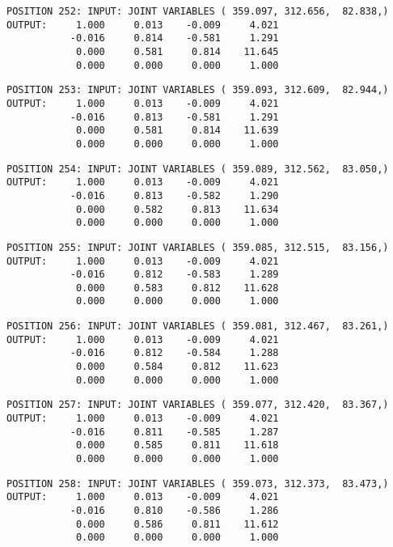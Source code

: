 \begin{verbatim}
POSITION 252: INPUT: JOINT VARIABLES ( 359.097, 312.656,  82.838,)
OUTPUT:     1.000     0.013    -0.009     4.021
           -0.016     0.814    -0.581     1.291
            0.000     0.581     0.814    11.645
            0.000     0.000     0.000     1.000
\end{verbatim} \pagebreak[1]\begin{verbatim}
POSITION 253: INPUT: JOINT VARIABLES ( 359.093, 312.609,  82.944,)
OUTPUT:     1.000     0.013    -0.009     4.021
           -0.016     0.813    -0.581     1.291
            0.000     0.581     0.814    11.639
            0.000     0.000     0.000     1.000
\end{verbatim} \pagebreak[1]\begin{verbatim}
POSITION 254: INPUT: JOINT VARIABLES ( 359.089, 312.562,  83.050,)
OUTPUT:     1.000     0.013    -0.009     4.021
           -0.016     0.813    -0.582     1.290
            0.000     0.582     0.813    11.634
            0.000     0.000     0.000     1.000
\end{verbatim} \pagebreak[1]\begin{verbatim}
POSITION 255: INPUT: JOINT VARIABLES ( 359.085, 312.515,  83.156,)
OUTPUT:     1.000     0.013    -0.009     4.021
           -0.016     0.812    -0.583     1.289
            0.000     0.583     0.812    11.628
            0.000     0.000     0.000     1.000
\end{verbatim} \pagebreak[1]\begin{verbatim}
POSITION 256: INPUT: JOINT VARIABLES ( 359.081, 312.467,  83.261,)
OUTPUT:     1.000     0.013    -0.009     4.021
           -0.016     0.812    -0.584     1.288
            0.000     0.584     0.812    11.623
            0.000     0.000     0.000     1.000
\end{verbatim} \pagebreak[1]\begin{verbatim}
POSITION 257: INPUT: JOINT VARIABLES ( 359.077, 312.420,  83.367,)
OUTPUT:     1.000     0.013    -0.009     4.021
           -0.016     0.811    -0.585     1.287
            0.000     0.585     0.811    11.618
            0.000     0.000     0.000     1.000
\end{verbatim} \pagebreak[1]\begin{verbatim}
POSITION 258: INPUT: JOINT VARIABLES ( 359.073, 312.373,  83.473,)
OUTPUT:     1.000     0.013    -0.009     4.021
           -0.016     0.810    -0.586     1.286
            0.000     0.586     0.811    11.612
            0.000     0.000     0.000     1.000
\end{verbatim} \pagebreak[1]\begin{verbatim}

\end{verbatim}
